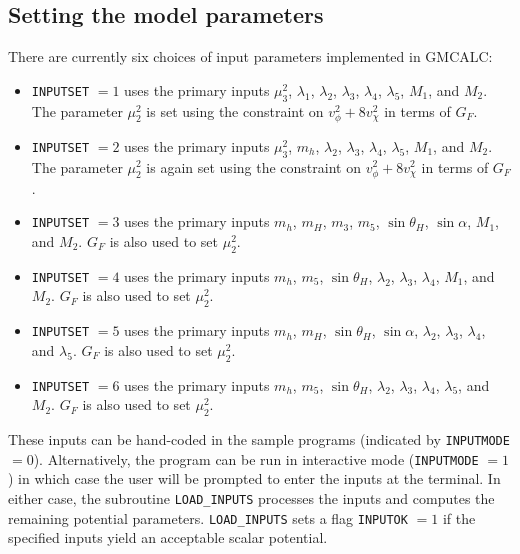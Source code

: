 \documentclass[11pt]{article}
\begin{document}
\subsection{Setting the model parameters}

There are currently six choices of input parameters implemented in GMCALC:
\begin{itemize}

\item {\tt INPUTSET} $= 1$ uses the primary inputs $\mu_3^2$, $\lambda_1$, $\lambda_2$, $\lambda_3$, $\lambda_4$, $\lambda_5$, $M_1$, and $M_2$.  The parameter $\mu_2^2$ is set using the constraint on $v_{\phi}^2 + 8 v_{\chi}^2$ in terms of $G_F$.

\item {\tt INPUTSET} $= 2$ uses the primary inputs $\mu_3^2$, $m_h$, $\lambda_2$, $\lambda_3$, $\lambda_4$, $\lambda_5$, $M_1$, and $M_2$.  The parameter $\mu_2^2$ is again set using the constraint on $v_{\phi}^2 + 8 v_{\chi}^2$ in terms of $G_F$.

\item {\tt INPUTSET} $= 3$ uses the primary inputs $m_h$, $m_H$, $m_3$, $m_5$, $\sin\theta_H$, $\sin\alpha$, $M_1$, and $M_2$.  $G_F$ is also used to set $\mu_2^2$.

\item {\tt INPUTSET} $= 4$ uses the primary inputs $m_h$, $m_5$, $\sin\theta_H$, $\lambda_2$, $\lambda_3$, $\lambda_4$, $M_1$, and $M_2$.  $G_F$ is also used to set $\mu_2^2$.

\item {\tt INPUTSET} $= 5$ uses the primary inputs $m_h$, $m_H$, $\sin\theta_H$, $\sin\alpha$, $\lambda_2$, $\lambda_3$, $\lambda_4$, and $\lambda_5$.  $G_F$ is also used to set $\mu_2^2$.

\item {\tt INPUTSET} $= 6$ uses the primary inputs $m_h$, $m_5$, $\sin\theta_H$, $\lambda_2$, $\lambda_3$, $\lambda_4$, $\lambda_5$, and $M_2$.  $G_F$ is also used to set $\mu_2^2$.
\end{itemize}
These inputs can be hand-coded in the sample programs (indicated by {\tt INPUTMODE} $= 0$).  Alternatively, the program can be run in interactive mode ({\tt INPUTMODE} $= 1$) in which case the user will be prompted to enter the inputs at the terminal.  In either case, the subroutine {\tt LOAD\_INPUTS} processes the inputs and computes the remaining potential parameters.  {\tt LOAD\_INPUTS} sets a flag {\tt INPUTOK} $= 1$ if the specified inputs yield an acceptable scalar potential.
\end{document}
